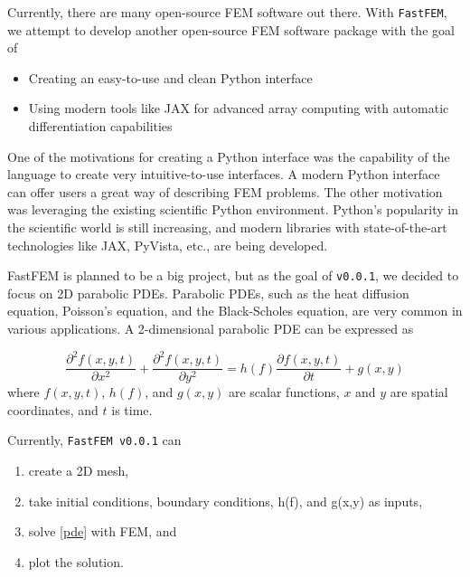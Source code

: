 \documentclass[headings=standardclasses, abstract=true]{scrartcl}
\begin{document}
Currently, there are many open-source FEM software out there\supercite{fem_getdp, fem_agros, fem_calculix, fem_elmerfem, fem_freefem, fem_goma, fem_fenicsx, fem_dealii}. With \texttt{FastFEM}\supercite{fastfem}, we attempt to develop another open-source FEM software package with the goal of

\begin{itemize}
    \item Creating an easy-to-use and clean Python interface
    \item Using modern tools like JAX\supercite{jax2018github} for advanced array computing with automatic differentiation capabilities
\end{itemize}

One of the motivations for creating a Python interface was the capability of the language to create very intuitive-to-use interfaces. A modern Python interface can offer users a great way of describing FEM problems. The other motivation was leveraging the existing scientific Python environment. Python's popularity in the scientific world is still increasing, and modern libraries with state-of-the-art technologies like JAX, PyVista\supercite{Sullivan2019}, etc., are being developed.


FastFEM is planned to be a big project, but as the goal of \texttt{v0.0.1}, we decided to focus on 2D parabolic PDEs. Parabolic PDEs, such as the heat diffusion equation, Poisson's equation, and the Black-Scholes equation, are very common in various applications. A 2-dimensional parabolic PDE can be expressed as

\begin{equation}
    \frac{\partial^2 f(x,y,t)}{\partial x^2} + \frac{\partial^2 f(x,y,t)}{\partial y^2}
    =
    h(f) \frac{\partial f(x,y,t)}{\partial t} + g(x,y)
    \label{pde}
\end{equation}
where $f(x,y,t)$, $h(f)$, and $g(x,y)$ are scalar functions, $x$ and $y$ are spatial coordinates, and $t$ is time.

Currently, \texttt{FastFEM v0.0.1} can
\begin{enumerate}
    \item create a 2D mesh,
    \item take initial conditions, boundary conditions, h(f), and g(x,y) as inputs,
    \item solve \autoref{pde} with FEM, and
    \item plot the solution.
\end{enumerate}
\end{document}
